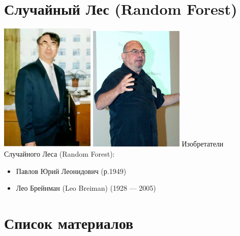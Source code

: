 \documentclass{beamer}
\begin{document}
\section{Случайный Лес (Random Forest)}\label{section:random_forest}

\begin{frame}
	\includegraphics[width=4.5cm]{../pic/ylpavlov.png}
	\includegraphics[width=4.5cm]{../pic/leo_breiman.png}
	Изобретатели Случайного Леса (Random Forest):
	\begin{itemize}
		\item Павлов Юрий Леонидович (р.1949)
		\item Лео Брейнман (Leo Breiman) (1928 — 2005)
	\end{itemize}
\end{frame}
  
\section{Список материалов}
  
\end{document}
